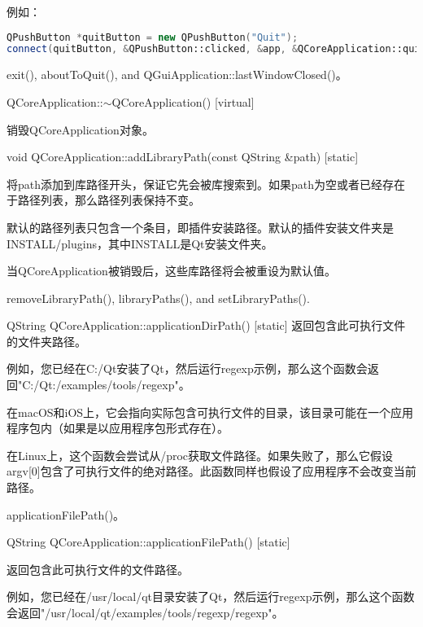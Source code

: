 例如：

\begin{lstlisting}[language=C++]
QPushButton *quitButton = new QPushButton("Quit");
connect(quitButton, &QPushButton::clicked, &app, &QCoreApplication::quit, Qt::QueuedConnection);
\end{lstlisting}

\begin{seeAlso}
exit(), aboutToQuit(), and QGuiApplication::lastWindowClosed()。
\end{seeAlso}


QCoreApplication::$\sim$QCoreApplication() [virtual]

销毁QCoreApplication对象。

void QCoreApplication::addLibraryPath(const QString \&path) [static]

将path添加到库路径开头，保证它先会被库搜索到。如果path为空或者已经存在于路径列表，那么路径列表保持不变。

默认的路径列表只包含一个条目，即插件安装路径。默认的插件安装文件夹是INSTALL/plugins，其中INSTALL是Qt安装文件夹。

当QCoreApplication被销毁后，这些库路径将会被重设为默认值。

\begin{seeAlso}
removeLibraryPath(), libraryPaths(), and setLibraryPaths().
\end{seeAlso}

QString QCoreApplication::applicationDirPath() [static]
返回包含此可执行文件的文件夹路径。

例如，您已经在C:/Qt安装了Qt，然后运行regexp示例，那么这个函数会返回"C:/Qt:/examples/tools/regexp"。

在macOS和iOS上，它会指向实际包含可执行文件的目录，该目录可能在一个应用程序包内（如果是以应用程序包形式存在）。

\begin{warning}
在Linux上，这个函数会尝试从/proc获取文件路径。如果失败了，那么它假设argv[0]包含了可执行文件的绝对路径。此函数同样也假设了应用程序不会改变当前路径。
\end{warning}

\begin{seeAlso}
applicationFilePath()。
\end{seeAlso}


QString QCoreApplication::applicationFilePath() [static]

返回包含此可执行文件的文件路径。

例如，您已经在/usr/local/qt目录安装了Qt，然后运行regexp示例，那么这个函数会返回"/usr/local/qt/examples/tools/regexp/regexp"。


